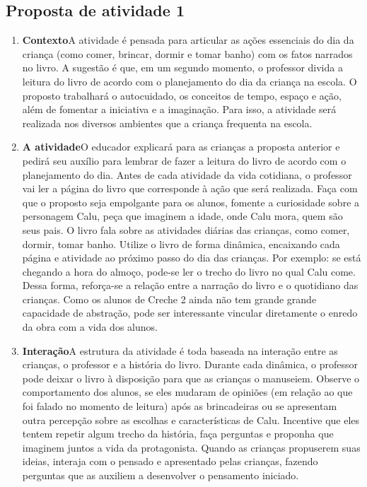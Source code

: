 \documentclass[11pt]{extarticle}
\begin{document}
\subsection{Proposta de atividade 1}



\begin{enumerate}
\item \textbf{Contexto}\quad A atividade é pensada para articular as ações essenciais do dia da criança (como comer, brincar, dormir e tomar banho) com os fatos narrados no livro. A sugestão é que, em um segundo momento, o professor divida a leitura do livro de acordo com o planejamento do dia da criança na escola. O proposto trabalhará o autocuidado, os conceitos de tempo, espaço e ação, além de fomentar a iniciativa e a imaginação. 
Para isso, a atividade será realizada nos diversos ambientes que a criança frequenta na escola. 

\item \textbf{A atividade}\quad O educador explicará para as crianças a proposta anterior e pedirá seu auxílio para lembrar de fazer a leitura do livro de acordo com o planejamento do dia. Antes de cada atividade da vida cotidiana, o professor vai ler a página do livro que corresponde à ação que será realizada. Faça com que o proposto seja empolgante para os alunos, fomente a curiosidade sobre a personagem Calu, peça que imaginem a idade, onde Calu mora, quem são seus pais. 
O livro fala sobre as atividades diárias das crianças, como comer, dormir, tomar banho. Utilize o livro de forma dinâmica, encaixando cada página e atividade ao próximo passo do dia das crianças. Por exemplo: se está chegando a hora do almoço, pode-se ler o trecho do livro no qual Calu come.
Dessa forma, reforça-se a relação entre a narração do livro e o quotidiano das crianças. Como os alunos de Creche 2 ainda não tem grande grande capacidade de abstração, pode ser interessante vincular diretamente o enredo da obra com a vida dos alunos.

\item \textbf{Interação}\quad A estrutura da atividade é toda baseada na interação entre as crianças, o professor e a história do livro. Durante cada dinâmica, o professor pode deixar o livro à disposição para que as crianças o manuseiem. Observe o comportamento dos alunos, se eles mudaram de opiniões (em relação ao que foi falado no momento de leitura) após as brincadeiras ou se apresentam outra percepção sobre as escolhas e características de Calu. Incentive que eles tentem repetir algum trecho da história,
faça perguntas e proponha que imaginem juntos a vida da protagonista. Quando as crianças propuserem suas ideias, interaja com o pensado e apresentado pelas crianças, fazendo perguntas que as auxiliem a desenvolver o pensamento iniciado.


\end{enumerate}
\end{document}

